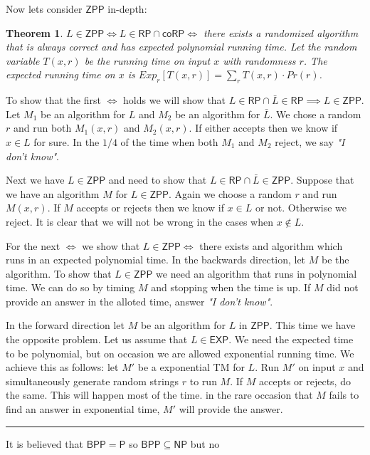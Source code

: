 \documentclass[twoside]{article}
\newcounter{lecnum}
\newtheorem{theorem}{Theorem}[lecnum]
\newenvironment{proof}{{\bf Proof:}}{\hfill\rule{2mm}{2mm}}
\def\P{\mathsf{P}}
\def\NP{\mathsf{NP}}
\def\BPP{\mathsf{BPP}}
\def\RP{\mathsf{RP}}
\def\ZPP{\mathsf{ZPP}}
\def\coRP{\mathsf{coRP}}
\def\EXP{\mathsf{EXP}}
\begin{document}
Now lets consider $\ZPP$ in-depth:
\begin{theorem}
$L \in \ZPP \iff L \in \RP \cap \coRP \iff$ there exists a randomized algorithm that is always correct and has expected polynomial running time. Let the random variable $T(x, r)$ be the running time on input $x$ with randomness $r$. The expected running time on $x$ is $Exp_r[T(x,r)] = \sum_r T(x,r) \cdot Pr(r)$. 	  
\end{theorem}
\begin{proof}
To show that the first $\iff$ holds we will show that $L \in \RP \cap \bar{L} \in \RP \implies L \in \ZPP$. Let $M_1$ be an algorithm for $L$ and $M_2$ be an algorithm for $\bar{L}$. We chose a random $r$ and run both $M_1(x,r)$ and $M_2(x,r)$. If either accepts then we know if $x \in L$ for sure. In the $1/4$ of the time when both $M_1$ and $M_2$ reject, we say \emph{"I don't know"}.

Next we have $L \in \ZPP$ and need to show that $L \in \RP \cap \bar{L} \in \ZPP$. Suppose that we have an algorithm $M$ for $L \in \ZPP$. Again we choose a random $r$ and run $M(x,r)$. If $M$ accepts or rejects then we know if $x \in L$ or not. Otherwise we reject. It is clear that we will not be wrong in the cases when $x \notin L$.

For the next $\iff$ we show that $L \in \ZPP \iff$ there exists and algorithm which runs in an expected polynomial time. In the backwards direction, let $M$ be the algorithm. To show that $L \in \ZPP$ we need an algorithm that runs in polynomial time. We can do so by timing $M$ and stopping when the time is up. If $M$ did not provide an answer in the alloted time, answer \emph{"I don't know"}.

In the forward direction let $M$ be an algorithm for $L$ in $\ZPP$. This time we have the opposite problem. Let us assume that $L \in \EXP$. We need the expected time to be polynomial, but on occasion we are allowed exponential running time. We achieve this as follows: let $M'$ be a exponential TM for $L$. Run $M'$ on input $x$ and simultaneously generate random strings $r$ to run $M$. If $M$ accepts or rejects, do the same. This will happen most of the time. in the rare occasion that $M$ fails to find an answer in exponential time, $M'$ will provide the answer.
\end{proof}

It is believed that $\BPP = \P$ so $\BPP \subseteq \NP$ but no
\end{document}
